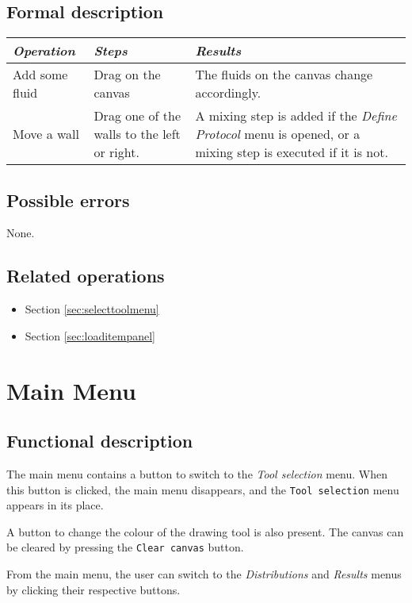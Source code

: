   \subsection*{Formal description}
  \begin{tabularx}{\textwidth}{XXX}
    \toprule
    \emph{Operation} & \emph{Steps} & \emph{Results} \\
    \midrule
    Add some fluid & Drag on the canvas & The fluids on the canvas change accordingly. \\
    \midrule
    Move a wall & Drag one of the walls to the left or right. & A mixing step is added if the \emph{Define Protocol} menu is opened, or a mixing step is executed if it is not. \\
    \bottomrule
  \end{tabularx}

  \subsection*{Possible errors}
  None.

  \subsection*{Related operations}
  \begin{itemize}
    \item Section \ref{sec:selecttoolmenu}
    \item Section \ref{sec:loaditempanel}
  \end{itemize}  

\section{Main Menu}\label{sec:mainmenu}
  \subsection*{Functional description}
  The main menu contains a button to switch to the \emph{Tool selection} menu. When this button is clicked, the main menu disappears, and the \texttt{Tool selection} menu appears in its place.
  
  A button to change the colour of the drawing tool is also present. The canvas can be cleared by pressing the \texttt{Clear canvas} button.
  
  From the main menu, the user can switch to the \emph{Distributions} and \emph{Results} menus by clicking their respective buttons.
  
